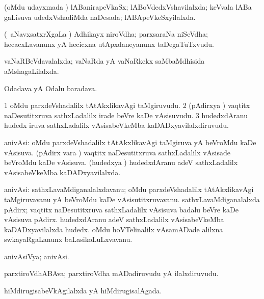 \bentry
{}
\gl{\gu}
\bmng
(oMdu udayxmada \vi) lABanirapeVkaSx; lABoVdedxVshavilalxda; keVvala lABa gaLisuva udedxVshadiMda naDesada; lABApeVkeSxyilalxda. 
\emng
\eentry

\bentry
{}
\gl{\nA}
\bmng
(\kanmu\ aNavxsatxrXgaLa \vi) Adhikayx niroVdha; parxsaraNa niSeVdha; hecacxLavanunx yA hecicxna utApxdaneyanunx taDegaTuTxvudu. 
\emng
\eentry

\bentry
{}
\gl{\gu}
\bmng
vaNaRBeVdavalalxda; vaNaRda yA vaNaRkekx saMbaMdhisida aMshagaLilalxda. 
\emng
\eentry

\bentry
{}
\gl{\nA}
\bmng
Odadava yA Odalu baradava. 
\emng
\eentry

\bentry
{}
\gl{\nA}
\bmng
\bnum
\num{1} oMdu parxdeVshadalilx tAtAkxlikavAgi taMgiruvudu. 
\num{2} (pAdirxya \vi) vaqtitx naDesutitxruva sathxLadalilx irade beVre kaDe vAsisuvudu. 
\num{3} hudedxdAranu hudedx iruva sathxLadalilx vAsisabeVkeMba kaDADxyavilalxdiruvudu. 
\enum
\emng
\eentry

\bentry
{}
\gl{\gu}
\bmng
anivAsi: 
\banum
{} oMdu parxdeVshadalilx tAtAkxlikavAgi taMgiruva yA beVroMdu kaDe vAsisuva. 
 (pAdirx \mo vara \vi) vaqtitx naDesutitxruva sathxLadalilx vAsisade beVroMdu kaDe vAsisuva. 
 (hudedxya \vi) hudedxdAranu adeV sathxLadalilx vAsisabeVkeMba kaDADxyavilalxda. 
\eanum
\emng
\eentry

\bentry
{}
\gl{\nA}
\bmng
anivAsi: 
\banum
{} sathxLavaMdiganalalxdavanu; oMdu parxdeVshadalilx tAtAkxlikavAgi taMgiruvavanu yA beVroMdu kaDe vAsisutitxruvavanu. 
 sathxLavaMdiganalalxda pAdirx; vaqtitx naDesutitxruva sathxLadalilx vAsisuva badalu beVre kaDe vAsisuva pAdirx. 
 hudedxdAranu adeV sathxLadalilx vAsisabeVkeMba kaDADxyavilalxda hudedx. 
 oMdu hoVTelinalilx vAsamADade alilxna swkayaRgaLanunx baLasikoLuLxvavanu. 
\eanum
\emng
\eentry

\bentry
{}
\gl{\gu}
\bmng
anivAsiVya; anivAsi. 
\emng
\eentry

\bentry
{}
\gl{\nA}
\bmng
parxtiroVdhABAva; parxtiroVdha mADadiruvudu yA ilalxdiruvudu. 
\emng
\eentry

\bentry
{}
\gl{\gu}
\bmng
hiMdirugisabeVkAgilalxda yA hiMdirugisalAgada. 
\emng
\eentry

